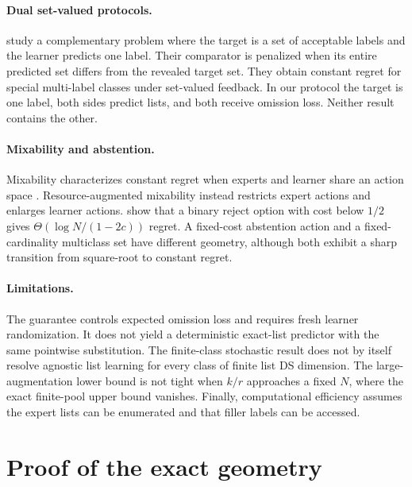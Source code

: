 \documentclass{article}
\theoremstyle{definition}
\theoremstyle{remark}
\newcommand{\1}{\mathbf 1}
\begin{document}
\paragraph{Dual set-valued protocols.}
\citet{pour2026multiple} study a complementary problem where the target is a set of acceptable labels and the learner predicts one label. Their comparator is penalized when its entire predicted set differs from the revealed target set. They obtain constant regret for special multi-label classes under set-valued feedback. In our protocol the target is one label, both sides predict lists, and both receive omission loss. Neither result contains the other.

\paragraph{Mixability and abstention.}
Mixability characterizes constant regret when experts and learner share an action space \citep{vovk1998game,vanerven2012mixability,reid2015generalized}. Resource-augmented mixability instead restricts expert actions and enlarges learner actions. \citet{neu2020abstention} show that a binary reject option with cost below \(1/2\) gives \(\Theta(\log N/(1-2c))\) regret. A fixed-cost abstention action and a fixed-cardinality multiclass set have different geometry, although both exhibit a sharp transition from square-root to constant regret.

\paragraph{Limitations.}
The guarantee controls expected omission loss and requires fresh learner randomization. It does not yield a deterministic exact-list predictor with the same pointwise substitution. The finite-class stochastic result does not by itself resolve agnostic list learning for every class of finite list DS dimension. The large-augmentation lower bound is not tight when \(k/r\) approaches a fixed \(N\), where the exact finite-pool upper bound vanishes. Finally, computational efficiency assumes the expert lists can be enumerated and that filler labels can be accessed.




\appendix

\section{Proof of the exact geometry}
\label{app:geometry}
\end{document}
